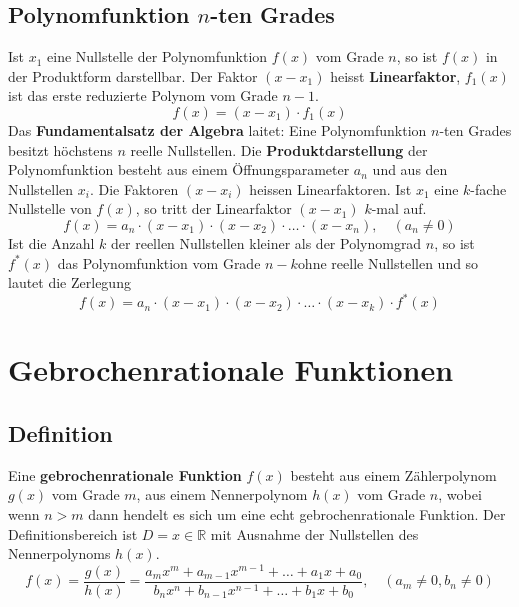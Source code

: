 \subsection{Polynomfunktion $n$-ten Grades}
Ist $x_1$ eine Nullstelle der Polynomfunktion $f\left(x\right)$ vom Grade $n$, so ist $f\left(x\right)$ in der Produktform darstellbar. Der Faktor $\left(x-x_1\right)$ heisst \textbf{Linearfaktor}, $f_1\left(x\right)$ ist das erste reduzierte Polynom vom Grade $n-1$. 
\begin{equation}
\boxed{f\left(x\right)=\left(x-x_1\right)\cdot f_1\left(x\right)}
\end{equation}
Das \textbf{Fundamentalsatz der Algebra} laitet: Eine Polynomfunktion $n$-ten Grades besitzt höchstens $n$ reelle Nullstellen. 
\newline\newline
Die \textbf{Produktdarstellung} der Polynomfunktion besteht aus einem Öffnungsparameter $a_n$ und aus den Nullstellen $x_i$. Die Faktoren $\left(x-x_i\right)$ heissen Linearfaktoren. Ist $x_1$ eine $k$-fache Nullstelle von $f\left(x\right)$, so tritt der Linearfaktor $\left(x-x_1\right)$ $k$-mal auf. 
\begin{equation}
\boxed{f\left(x\right)=a_n\cdot \left(x-x_1\right)\cdot \left(x-x_2\right)\cdot \dotso \cdot \left(x-x_n\right),\quad \left(a_n\neq 0\right)}
\end{equation}
Ist die Anzahl $k$ der reellen Nullstellen kleiner als der Polynomgrad $n$, so ist $f^*\left(x\right)$ das Polynomfunktion vom Grade $n-k$ohne reelle Nullstellen und so lautet die Zerlegung 
\begin{equation}
\boxed{f\left(x\right)=a_n\cdot \left(x-x_1\right)\cdot \left(x-x_2\right)\cdot \dotso \cdot \left(x-x_k\right)\cdot f^*\left(x\right)}
\end{equation}
\section{Gebrochenrationale Funktionen}
\subsection{Definition}
Eine \textbf{gebrochenrationale Funktion} $f\left(x\right)$ besteht aus einem Zählerpolynom $g\left(x\right)$ vom Grade $m$, aus einem Nennerpolynom $h\left(x\right)$ vom Grade $n$, wobei wenn $n>m$ dann hendelt es sich um eine echt gebrochenrationale Funktion. Der Definitionsbereich ist $D=x\in \mathbb{R}$ mit Ausnahme der Nullstellen des Nennerpolynoms $h\left(x\right)$.
\begin{equation}
\boxed{f\left(x\right)=\dfrac{g\left(x\right)}{h\left(x\right)}=\dfrac{a_mx^m+a_{m-1}x^{m-1}+\dotso + a_1x+a_0}{b_nx^n+b_{n-1}x^{n-1}+\dotso + b_1x+b_0},\quad \left(a_m\neq 0, b_n\neq 0\right)}
\end{equation}
